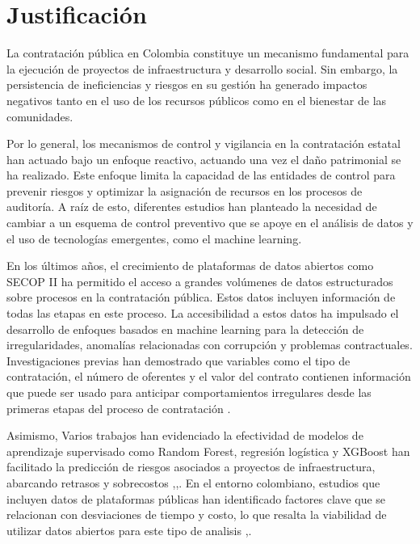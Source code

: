 \section{Justificación}

La contratación pública en Colombia constituye un mecanismo fundamental para la ejecución de proyectos de infraestructura y desarrollo social. Sin embargo, la persistencia de ineficiencias y riesgos en su gestión ha generado impactos negativos tanto en el uso de los recursos públicos como en el bienestar de las comunidades.


Por lo general, los mecanismos de control y vigilancia en la contratación estatal han actuado bajo un enfoque reactivo, actuando una vez el daño patrimonial se ha realizado. Este enfoque limita la capacidad de las entidades de control para prevenir riesgos y optimizar la asignación de recursos en los procesos de auditoría. A raíz de esto, diferentes estudios han planteado la necesidad de cambiar a un esquema de control preventivo que se apoye en el análisis de datos y el uso de tecnologías emergentes, como el machine learning.

En los últimos años, el crecimiento de plataformas de datos abiertos como SECOP II ha permitido el acceso a grandes volúmenes de datos estructurados sobre procesos en la contratación pública. Estos datos incluyen información de todas las etapas en este proceso. La accesibilidad a estos datos ha impulsado el desarrollo de enfoques basados en machine learning para la detección de irregularidades, anomalías relacionadas con corrupción y problemas contractuales.  Investigaciones previas han demostrado que variables como el tipo de contratación, el número de oferentes y el valor del contrato contienen información que puede ser usado para anticipar comportamientos irregulares desde las primeras etapas del proceso de contratación \cite{gallego2021preventing} \cite{salazar2024vigia}.

Asimismo, Varios trabajos han evidenciado la efectividad de modelos de aprendizaje supervisado como Random Forest, regresión logística y XGBoost han facilitado la predicción de riesgos asociados a proyectos de infraestructura, abarcando retrasos y sobrecostos \cite{decarolis2022corruption},\cite{alshboul2022extreme},\cite{galjanic2025neural}. En el entorno colombiano, estudios que incluyen datos de plataformas públicas han identificado factores clave que se relacionan con  desviaciones de tiempo y costo, lo que resalta la viabilidad de utilizar datos abiertos para este tipo de analisis \cite{gomez2025data},\cite{gomez2025analyzing}.




